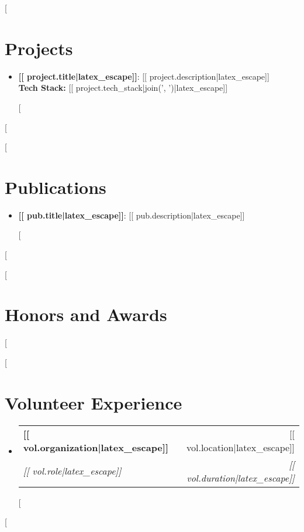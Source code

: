 \documentclass[a4paper,20pt]{article}
\makeatletter
\newcommand{\resumeItem}[2]{%
  \item\small{\textbf{#1}: #2 \vspace{-2pt}}%
}
\newcommand{\resumeSubItem}[2]{%
  \resumeItem{#1}{#2}\vspace{-3pt}%
}
\newcommand{\resumeSubheading}[4]{%
  \vspace{-1pt}\item%
  \begin{tabular*}{0.97\textwidth}{l@{\extracolsep{\fill}}r}%
    \textbf{#1} & #2 \\%
    \textit{#3} & \textit{#4} \\%
  \end{tabular*}\vspace{-5pt}%
}
\newcommand{\resumeSubHeadingListStart}{\begin{itemize}[leftmargin=*]}%
\newcommand{\resumeSubHeadingListEnd}{\end{itemize}}%
\makeatother
\begin{document}
[%
\section{Projects}
\resumeSubHeadingListStart
  [%
    \resumeSubItem{[[ project.title|latex_escape]]}{%
      [[ project.description|latex_escape]]\\[1ex]
      \textbf{Tech Stack:} [[ project.tech_stack|join(', ')|latex_escape]]
    }
  [%
\resumeSubHeadingListEnd
[%


[%
\section{Publications}
\resumeSubHeadingListStart
  [%
    \resumeSubItem{[[ pub.title|latex_escape]]}{[[ pub.description|latex_escape]]}
  [%
\resumeSubHeadingListEnd
[%

[%
\section{Honors and Awards}
[%

[%
\section{Volunteer Experience}
\resumeSubHeadingListStart
  [%
    \resumeSubheading
      {[[ vol.organization|latex_escape]]}{[[ vol.location|latex_escape]]}
      {[[ vol.role|latex_escape]]}{[[ vol.duration|latex_escape]]}
  [%
\resumeSubHeadingListEnd
[%
\end{document}

